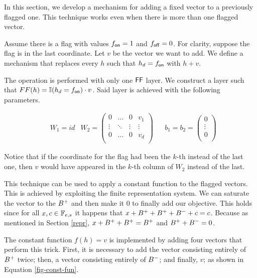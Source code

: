 In this section, we develop a mechanism for adding a fixed vector to a previously flagged one.
This technique works even when there is more than one flagged vector.

\medskip

Assume there is a flag with values $f_{\mathsf{on}} = 1$ and $f_{\mathsf{off}} = 0$.
For clarity, suppose the flag is in the last coordinate.
Let $v$ be the vector we want to add.
We define a mechanism that replaces every $h$ such that $h_d = f_{\mathsf{on}}$ with $h + v$.

The operation is performed with only one $\mathsf{FF}$ layer.
We construct a layer such that $FF(h) = \mathbb{I}(h_d = f_{\mathsf{on}})\cdot v$.
Said layer is achieved with the following parameters.

\begin{align*}
    & W_1 = id
    & W_2  = \left(\begin{matrix}
        0         &\dots  &0      & v_1       \\
        \vdots    &\ddots &\vdots & \vdots    \\
        0         &\dots  &0      & v_d       \\
    \end{matrix}\right) &
    & b_1 = b_2 = \left(\begin{matrix}
        0      \\
        \vdots \\
        0      \\
    \end{matrix}\right) 
\end{align*}

Notice that if the coordinate for the flag had been the $k$-th instead of the last one, then $v$ would have appeared in the $k$-th column of $W_2$ instead of the last.

\medskip

This technique can be used to apply a constant function to the flagged vectors.
This is achieved by exploiting the finite representation system.
We can saturate the vector to the $B^{+}$ and then make it $0$ to finally add our objective.
This holds since for all $x, c \in \mathbb{F}_{e,s}$ it happens that $x + B^{+} + B^{+} + B^{-} + c = c$.
Because as mentioned in Section \ref{repr}, $x + B^{+} + B^{+} = B^{+}$ and $B^{+} + B^{-} = 0$.

The constant function $f(h) = v$ is implemented by adding four vectors that perform this trick.
First, it is necessary to add the vector consisting entirely of $B^{+}$ twice; then, a vector consisting entirely of $B^{-}$; and finally, $v$; as shown in Equation \ref{fig-const-fun}.

